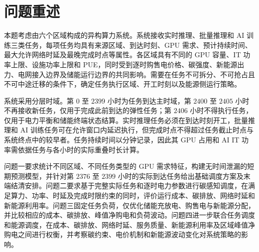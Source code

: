 \section{问题重述}

本题考虑由六个区域构成的异构算力系统。系统接收实时推理、批量推理和 AI 训练三类任务，每项任务均具有来源区域、到达时刻、GPU 需求、预计持续时间、最大允许网络时延及最晚完成时点等属性。各区域具有不同的 GPU 容量、IT 功率上限、设施功率上限和 PUE，同时受到逐时购售电价格、碳强度、新能源出力、电网接入边界及储能运行边界的共同影响。需要在任务不可拆分、不可抢占且不可中途迁移的条件下，确定任务执行区域、开工时刻以及能源侧运行策略。

系统采用分层时域。第 $0$ 至 $2399$ 小时为任务到达主时域，第 $2400$ 至 $2405$ 小时不再接收新任务，仅用于完成此前到达的弹性任务；第 $2406$ 小时不得执行任务，仅用于电力平衡和储能终端状态结算。实时推理任务必须在到达时刻开工，批量推理和 AI 训练任务可在允许窗口内延迟执行，但完成时点不得超过任务截止时点与系统终点中的较早者。任务持续时间以分钟记录，因此其 GPU 占用和 AI IT 功率需依据任务与各小时的实际重叠时长计算。

问题一要求统计不同区域、不同任务类型的 GPU 需求特征，构建无时间泄漏的短期预测模型，并针对第 $2376$ 至 $2399$ 小时的实际到达任务给出基础调度方案及末端结清安排。问题二要求基于完整实际任务和逐时电力参数进行碳感知调度，在满足算力、功率、时延及完成时限约束的同时，评价运行成本、碳排放、网络时延和新能源利用率。问题三固定任务负荷，仅优化储能充放电、购售电与新能源分配，并比较相应的成本、碳排放、峰值净购电和负荷波动。问题四进一步联合任务调度和能源调度，在成本、碳排放、网络时延、服务质量、新能源利用率及区域峰值净购电之间进行权衡，并考察碳约束、电价机制和新能源波动变化对系统策略的影响。
